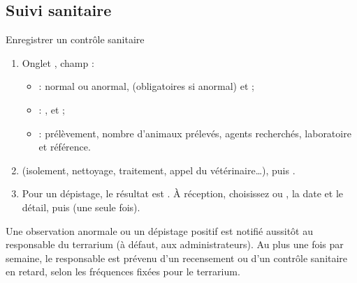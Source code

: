 \documentclass[11pt,a4paper]{article}
\begin{document}
\subsection{Suivi sanitaire}
\begin{procedure}{Enregistrer un contrôle sanitaire}
\begin{enumerate}
  \item Onglet , champ  :
    \begin{itemize}
      \item {} :  normal ou
        anormal,  (obligatoires si anormal) et
         ;
      \item {} : ,
         et  ;
      \item {} : prélèvement, nombre
        d'animaux prélevés, agents recherchés, laboratoire et référence.
    \end{itemize}
  \item {} (isolement, nettoyage, traitement, appel du
    vétérinaire…), puis .
  \item Pour un dépistage, le résultat est . À réception,
    choisissez  ou , la date et le détail, puis
     (une seule fois).
\end{enumerate}
\end{procedure}
\begin{regle}
Une observation anormale ou un dépistage positif est notifié aussitôt au
responsable du terrarium (à défaut, aux administrateurs). Au plus une fois
par semaine, le responsable est prévenu d'un recensement ou d'un contrôle
sanitaire en retard, selon les fréquences fixées pour le terrarium.
\end{regle}
\end{document}
